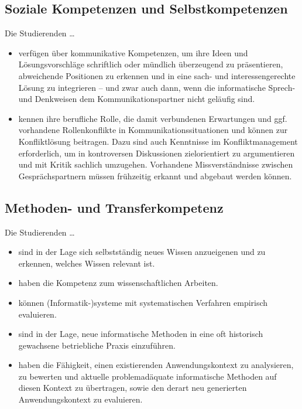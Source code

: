 \subsection{Soziale Kompetenzen und
Selbstkompetenzen\label{/mi-2017/selbstbericht/0200-qualifikationsziele/0000-qualifikationsziele}}\label{soziale-kompetenzen-und-selbstkompetenzenpathlabelmi-2017selbstbericht0200-qualifikationsziele0000-qualifikationsziele}

Die Studierenden \ldots{}

\begin{itemize}
\tightlist
\item
  verfügen über kommunikative Kompetenzen, um ihre Ideen und
  Lösungsvorschläge schriftlich oder mündlich überzeugend zu
  präsentieren, abweichende Positionen zu erkennen und in eine sach- und
  interessengerechte Lösung zu integrieren -- und zwar auch dann, wenn
  die informatische Sprech- und Denkweisen dem Kommunikationspartner
  nicht geläufig sind.
\item
  kennen ihre berufliche Rolle, die damit verbundenen Erwartungen und
  ggf. vorhandene Rollenkonflikte in Kommunikationssituationen und
  können zur Konfliktlösung beitragen. Dazu sind auch Kenntnisse im
  Konfliktmanagement erforderlich, um in kontroversen Diskussionen
  zielorientiert zu argumentieren und mit Kritik sachlich umzugehen.
  Vorhandene Missverständnisse zwischen Gesprächspartnern müssen
  frühzeitig erkannt und abgebaut werden können.
\end{itemize}

\subsection{Methoden- und
Transferkompetenz\label{/mi-2017/selbstbericht/0200-qualifikationsziele/0000-qualifikationsziele}}\label{methoden--und-transferkompetenzpathlabelmi-2017selbstbericht0200-qualifikationsziele0000-qualifikationsziele}

Die Studierenden \ldots{}

\begin{itemize}
\tightlist
\item
  sind in der Lage sich selbstständig neues Wissen anzueigenen und zu
  erkennen, welches Wissen relevant ist.
\item
  haben die Kompetenz zum wissenschaftlichen Arbeiten.
\item
  können (Informatik-)systeme mit systematischen Verfahren empirisch
  evaluieren.
\item
  sind in der Lage, neue informatische Methoden in eine oft historisch
  gewachsene betriebliche Praxis einzuführen.
\item
  haben die Fähigkeit, einen existierenden Anwendungskontext zu
  analysieren, zu bewerten und aktuelle problemadäquate informatische
  Methoden auf diesen Kontext zu übertragen, sowie den derart neu
  generierten Anwendungskontext zu evaluieren.
\end{itemize}

